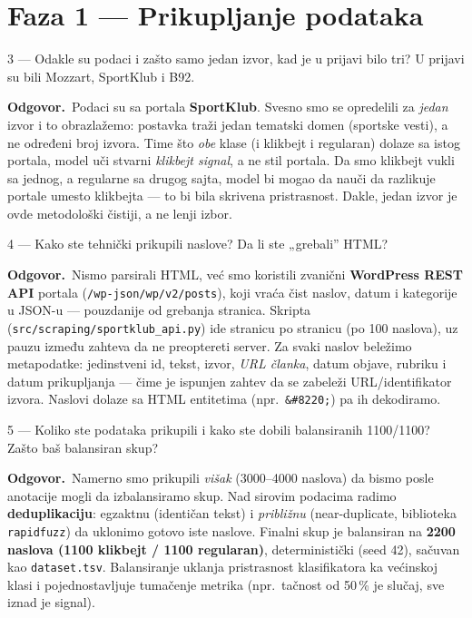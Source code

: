 \documentclass[11pt,a4paper]{article}
\newcommand{\kod}[1]{\texttt{#1}}
\newcommand{\odg}{\smallskip\noindent\textbf{Odgovor.}\ }
\begin{document}
\section{Faza 1 --- Prikupljanje podataka}

\begin{pitanje}{3 --- Odakle su podaci i zašto samo jedan izvor, kad je u prijavi bilo tri?}
U prijavi su bili Mozzart, SportKlub i B92.
\end{pitanje}
\odg Podaci su sa portala \textbf{SportKlub}. Svesno smo se opredelili za \emph{jedan}
izvor i to obrazlažemo: postavka traži jedan tematski domen (sportske vesti), a ne
određeni broj izvora. Time što \emph{obe} klase (i klikbejt i regularan) dolaze sa
istog portala, model uči stvarni \emph{klikbejt signal}, a ne stil portala. Da smo
klikbejt vukli sa jednog, a regularne sa drugog sajta, model bi mogao da nauči da
razlikuje portale umesto klikbejta --- to bi bila skrivena pristrasnost. Dakle, jedan
izvor je ovde metodološki čistiji, a ne lenji izbor.

\begin{pitanje}{4 --- Kako ste tehnički prikupili naslove?}
Da li ste „grebali'' HTML?
\end{pitanje}
\odg Nismo parsirali HTML, već smo koristili zvanični \textbf{WordPress REST API}
portala (\kod{/wp-json/wp/v2/posts}), koji vraća čist naslov, datum i kategorije u
JSON-u --- pouzdanije od grebanja stranica. Skripta
(\kod{src/scraping/sportklub\_api.py}) ide stranicu po stranicu (po 100 naslova), uz
pauzu između zahteva da ne preoptereti server. Za svaki naslov beležimo metapodatke:
jedinstveni id, tekst, izvor, \emph{URL članka}, datum objave, rubriku i datum
prikupljanja --- čime je ispunjen zahtev da se zabeleži URL/identifikator izvora.
Naslovi dolaze sa HTML entitetima (npr.\ \kod{\&\#8220;}) pa ih dekodiramo.

\begin{pitanje}{5 --- Koliko ste podataka prikupili i kako ste dobili balansiranih 1100/1100?}
Zašto baš balansiran skup?
\end{pitanje}
\odg Namerno smo prikupili \emph{višak} (3000--4000 naslova) da bismo posle anotacije
mogli da izbalansiramo skup. Nad sirovim podacima radimo \textbf{deduplikaciju}:
egzaktnu (identičan tekst) i \emph{približnu} (near-duplicate, biblioteka
\kod{rapidfuzz}) da uklonimo gotovo iste naslove. Finalni skup je balansiran na
\textbf{2200 naslova (1100 klikbejt / 1100 regularan)}, deterministički (seed 42),
sačuvan kao \kod{dataset.tsv}. Balansiranje uklanja pristrasnost klasifikatora ka
većinskoj klasi i pojednostavljuje tumačenje metrika (npr.\ tačnost od 50\,\% je
slučaj, sve iznad je signal).
\end{document}
